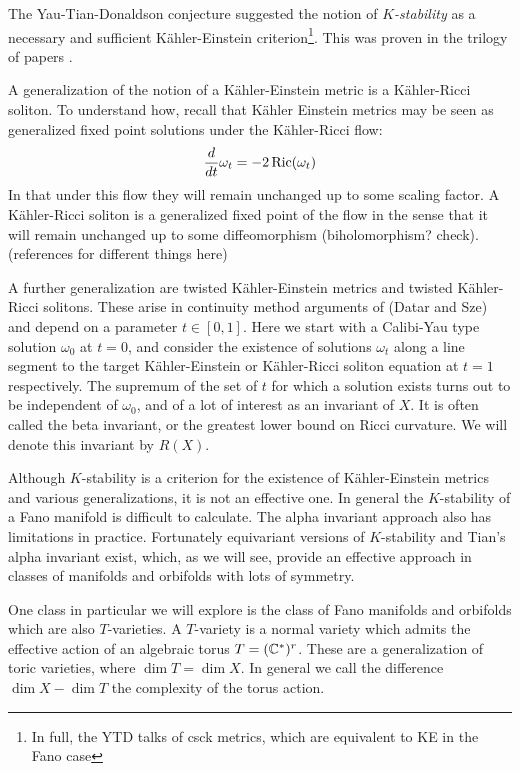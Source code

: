 The Yau-Tian-Donaldson conjecture suggested the notion of \textit{ \(K\)-stability} as a necessary and sufficient K\"ahler-Einstein criterion\footnote{In full, the YTD talks of csck metrics, which are equivalent to KE in the Fano case}. This was proven in the trilogy of papers \cite{chen2015kahler1,chen2015kahler2,chen2015kahler3}.

A generalization of the notion of a K\"ahler-Einstein metric is a K\"ahler-Ricci soliton. To understand how, recall that K\"ahler Einstein metrics may be seen as generalized fixed point solutions under the K\"ahler-Ricci flow:
\[
\frac{d}{dt} \omega_t = -2 \mathop{\rm Ric}\nolimits(\omega_t)
\]
In that under this flow they will remain unchanged up to some scaling factor. A K\"ahler-Ricci soliton is a generalized fixed point of the flow in the sense that it will remain unchanged up to some diffeomorphism (biholomorphism? check). (references for different things here)

A further generalization are twisted K\"ahler-Einstein metrics and twisted K\"ahler-Ricci solitons. These arise in continuity method arguments of (Datar and Sze) and depend on a parameter \(t \in [0,1]\). Here we start with a Calibi-Yau type solution \(\omega_0\) at \(t=0\), and consider the existence of solutions \(\omega_t\) along a line segment to the target K\"ahler-Einstein or K\"ahler-Ricci soliton equation at \(t= 1\) respectively. The supremum of the set of \(t\) for which a solution exists turns out to be independent of \(\omega_0\), and of a lot of interest as an invariant of \(X\). It is often called the beta invariant, or the greatest lower bound on Ricci curvature. We will denote this invariant by \(R(X)\).

Although \(K\)-stability is a criterion for the existence of K\"ahler-Einstein metrics and various generalizations, it is not an effective one. In general the \(K\)-stability of a Fano manifold is difficult to calculate. The alpha invariant approach also has limitations in practice. Fortunately equivariant versions of \(K\)-stability and Tian's alpha invariant exist, which, as we will see, provide an effective approach in classes of manifolds and orbifolds with lots of symmetry.

One class in particular we will explore is the class of Fano manifolds and orbifolds which are also \(T\)-varieties. A \(T\)-variety is a normal variety which admits the effective action of an algebraic torus \(T = (\mathbb{C}^*)^r\). These are a generalization of toric varieties, where \(\dim T = \dim X\). In general we call the difference \(\dim X - \dim T\) the complexity of the torus action.

